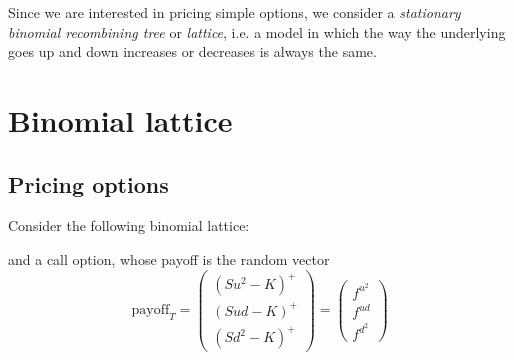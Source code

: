 \noindent Since we are interested in pricing simple options, we consider a \emph{stationary binomial recombining tree} or \emph{lattice}, i.e. a model in which the way the underlying goes up and down increases or decreases is always the same.

\section{Binomial lattice}
\subsection{Pricing options}
Consider the following binomial lattice:
\begin{center}
\end{center}
and a call option, whose payoff is the random vector
\begin{equation*}
    \mbox{payoff}_T = \left(
    \begin{matrix}
        (Su^2-K)^+ \\ (Sud-K)^+ \\ (Sd^2-K)^+
    \end{matrix}
    \right)
    =
    \left(
    \begin{matrix}
        f^{u^2} \\ f^{ud} \\ f^{d^2}
    \end{matrix}
    \right)
\end{equation*}

